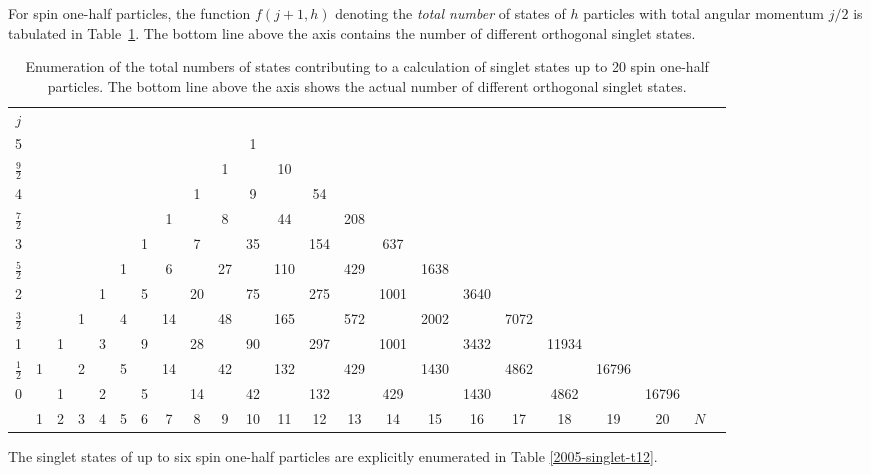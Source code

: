 \documentclass[rmp,amsfonts,showpacs,showkeys,preprint]{revtex4}
\begin{document}
For spin one-half particles, the function $f(j+1,h)$ denoting the {\em total number} of
states of $h$ particles with total angular momentum $j/2$ is
tabulated in
Table~\ref{2008-sg-tsoh-numbers}.
The bottom line above the axis contains the  number of different orthogonal singlet states.
\begin{table}
\begin{center}
\begin{tabular}{c|cccccccccccccccccccccc}
\multicolumn{1}{c}{$j$}\\
5                     &   &  &  &  &  &  &  &  &  & 1 &  &  &  &  &  &  &  &  &  &  \\
$\frac{9}{2}$         &   &  &  &  &  &  &  &  & 1 &  & 10 &  &  &  &  &  &  &  &  &  \\
4                     &   &  &  &  &  &  &  & 1 &  & 9 &  & 54 &  &  &  &  &  &  &  &  \\
$\frac{7}{2}$         &   &  &  &  &  &  & 1 &  & 8 &  & 44 &  & 208 &  &  &  &  &  &  &  \\
3                     &   &  &  &  &  & 1 &  & 7 &  & 35 &  & 154 &  & 637 &  &  &  &  &  &  \\
$\frac{5}{2}$         &   &  &  &  & 1 &  & 6 &  & 27 &  & 110 &  & 429 &  & 1638 &  &  &  &  &  \\
2                     &   &  &  & 1 &  & 5 &  & 20 &  & 75 &  & 275 &  & 1001 &  & 3640 &  &  &  &  \\
$\frac{3}{2}$         &   &  & 1 &  & 4 &  & 14 &  & 48 &  & 165 &  & 572 &  & 2002 &  & 7072 &  &  &  \\
1                     & & 1 &  & 3 &  & 9 &  & 28 &  & 90 &  & 297 &  & 1001 &  & 3432 &  & 11934 &  &  \\
$\frac{1}{2}$         & 1 &  & 2 &  & 5 &  & 14 &  & 42 &  & 132 &  & 429 &  & 1430 &  & 4862 &  & 16796 &  \\
0                     & & 1 &  & 2 &  & 5 &  & 14 &  & 42 &  & 132 &  & 429 &  & 1430 &  & 4862 &  & 16796\\
\cline{2-22}
\multicolumn{1}{c}{ }&1&2&3&4&5&6&7&8&9&10&11&12&13&14&15&16&17&18&19&20 &$N$
\end{tabular}
\end{center}
\caption{\label{2008-sg-tsoh-numbers} Enumeration of the total numbers of states contributing to a calculation of singlet states up to 20 spin one-half particles.
The bottom line above the axis shows the actual number of different orthogonal singlet states.}
\end{table}
The singlet states of up to six spin one-half  particles are explicitly enumerated in Table \ref{2005-singlet-t12}.
\end{document}
